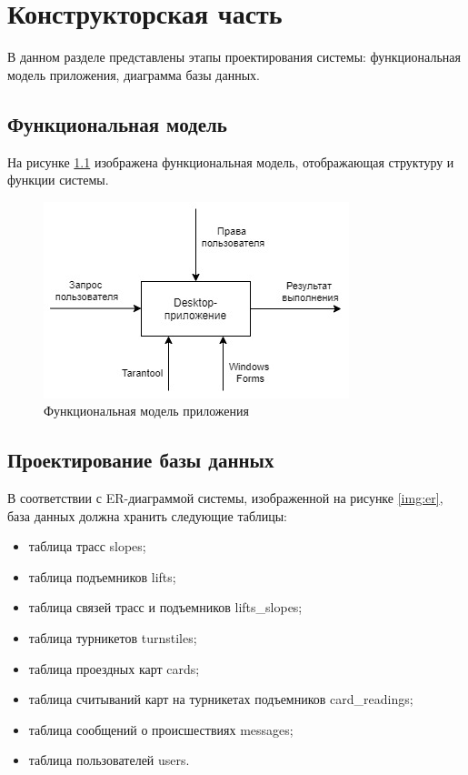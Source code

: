 \chapter{Конструкторская часть}

В данном разделе представлены этапы проектирования системы: функциональная модель приложения, диаграмма базы данных.

\section{Функциональная модель}

На рисунке \ref{img:func_model} изображена функциональная модель, отображающая структуру и функции системы.

\begin{figure}[h!]
	\begin{center}
		\includegraphics[scale=0.6]{../imgs/func_model.jpg}
	\end{center}
	\captionsetup{justification=centering}
	\caption{Функциональная модель приложения}
	\label{img:func_model}
\end{figure}









\section{Проектирование базы данных}


В соответствии с ER-диаграммой системы, изображенной на рисунке \ref{img:er}, база данных должна хранить следующие таблицы:  


\begin{itemize}
	\item таблица трасс slopes;
	\item таблица подъемников lifts;
	\item таблица связей трасс и подъемников lifts\_slopes;
	\item таблица турникетов turnstiles;
	\item таблица проездных карт cards;
	\item таблица считываний карт на турникетах подъемников card\_readings;
	\item таблица сообщений о происшествиях messages;
	\item таблица пользователей users.
\end{itemize}


